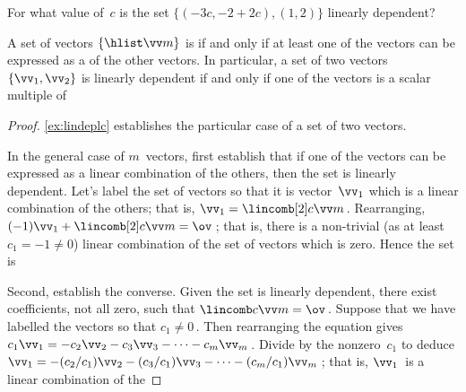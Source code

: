 \begin{activity}
For what value of~\(c\) is the set \(\{(-3c,-2+2c),(1,2)\}\) linearly dependent?
\end{activity}




\begin{theorem} \label{thm:lindeplc} 
A set of vectors \(\{\hlist\vv m\}\) is  if and only if at least one of the vectors can be expressed as a  of the other vectors.
In particular, a set of two vectors \(\{\vv_1,\vv_2\}\) is linearly dependent if and only if one of the vectors is a scalar multiple of 
\end{theorem}

\begin{proof} 
\cref{ex:lindeplc} establishes the particular case of a set of two vectors.

In the general case of \(m\)~vectors, first establish that if one of the vectors can be expressed as a {linear combination} of the others, then the set is linearly dependent.
Let's label the set of vectors so that it is vector~\(\vv_1\) which is a linear combination of the others; that is, \(\vv_1=\lincomb[2]c\vv m\)\,.
Rearranging, \((-1)\vv_1+\lincomb[2]c\vv m=\ov\)\,; that is, there is a non-trivial (as at least \(c_1=-1\neq0\)) linear combination of the set of vectors which is zero.
Hence the set is 

Second, establish the converse.  
Given the set is linearly dependent, there exist coefficients, not all zero, such that \(\lincomb c\vv m=\ov\)\,.  
Suppose that we have labelled the vectors so that \(c_1\neq 0\)\,.  
Then rearranging the equation gives
\(c_1\vv_1=-c_2\vv_2-c_3\vv_3-\cdots-c_m\vv_m\)\,.
Divide by the nonzero~\(c_1\) to deduce
\(\vv_1=-(c_2/c_1)\vv_2-(c_3/c_1)\vv_3-\cdots-(c_m/c_1)\vv_m\)\,;
that is, \(\vv_1\)~is a linear combination of the 
\end{proof}


